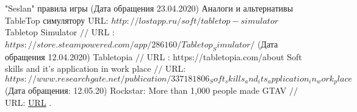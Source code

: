 \makeatletter \renewcommand{} \makeatother
\renewcommand\refname{Список использованных источников}
\begin{thebibliography}{00}
	
	 "Seslan" правила игры (Дата обращения 23.04.2020)
	Аналоги и альтернативы TableTop симулятору
	URL: $http://lostapp.ru/soft/tabletop-simulator$
	Tabletop Simulator $//$ URL : $https://store.steampowered.com/app/286160/Tabletop_Simulator/$ (Дата обращения 12.04.2020)
	Tabletopia $//$ URL : https://tabletopia.com/about
	Soft skills and it's application in work place $//$ URL: $https://www.researchgate.net/publication/337181806_Soft_skills_and_its_application_in_work_place$ (Дата обращения: 12.05.20)
	Rockstar: More than 1,000 people made GTAV $//$ URL: \url{URL} $.$
\end{thebibliography}
